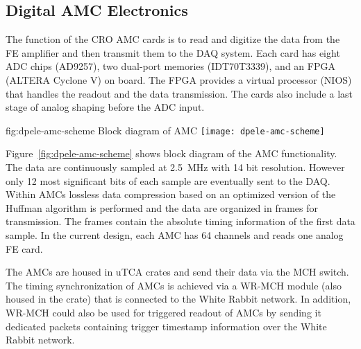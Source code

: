 
\subsection{Digital AMC Electronics}
\label{sec:fddp-tpc-elec-design-amc}
The function of the CRO AMC cards is to read and digitize the data from the FE amplifier and then transmit them to the DAQ system. Each card has eight ADC chips (AD9257), two dual-port memories (IDT70T3339), and an FPGA (ALTERA Cyclone V) on board. The FPGA provides a virtual processor (NIOS) that handles the readout and the data transmission.  The cards also include a last stage of analog shaping before the ADC input.

\begin{dunefigure}{fig:dpele-amc-scheme}
{Block diagram of AMC}
\texttt{[image: dpele-amc-scheme]}
\end{dunefigure}

Figure~\ref{fig:dpele-amc-scheme} shows block diagram of the AMC functionality. The data are continuously sampled at \SI{2.5}{\MHz} with \num{14} bit resolution. However only \num{12} most significant bits of each sample are eventually sent to the DAQ. Within AMCs lossless data compression based on an optimized version of the Huffman algorithm is performed and the data are organized in frames for transmission. The frames contain the absolute timing information of the first data sample.  In the current design, each AMC has 64 channels and reads one analog FE card.

The AMCs are housed in uTCA crates and send their data via the MCH switch. The timing synchronization of AMCs is achieved via a WR-MCH module (also housed in the crate) that is connected to the White Rabbit network. In addition, WR-MCH could also be used for triggered readout of AMCs by sending it dedicated packets containing trigger timestamp information over the White Rabbit network.

